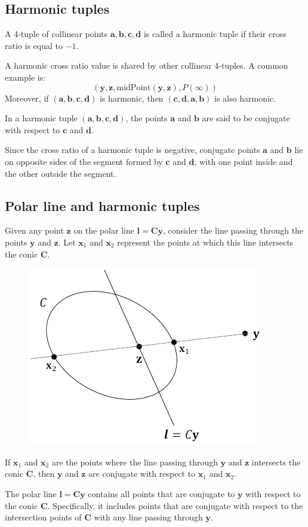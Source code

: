\subsection{Harmonic tuples}
\begin{definition}
    A 4-tuple of collinear points $\mathbf{a}, \mathbf{b}, \mathbf{c}, \mathbf{d}$ is called a harmonic tuple if their cross ratio is equal to $-1$.
\end{definition}
A harmonic cross ratio value is shared by other collinear 4-tuples. 
A common example is:
\[\left( \mathbf{y},\mathbf{z},\text{midPoint}(\mathbf{y},\mathbf{z}),P(\infty) \right)\]
Moreover, if $(\mathbf{a}, \mathbf{b}, \mathbf{c}, \mathbf{d})$ is harmonic, then $(\mathbf{c}, \mathbf{d}, \mathbf{a}, \mathbf{b})$ is also harmonic. 
\begin{definition}
    In a harmonic tuple $(\mathbf{a}, \mathbf{b}, \mathbf{c}, \mathbf{d})$, the points $\mathbf{a}$ and $\mathbf{b}$ are said to be conjugate with respect to $\mathbf{c}$ and $\mathbf{d}$.
\end{definition}
Since the cross ratio of a harmonic tuple is negative, conjugate points $\mathbf{a}$ and $\mathbf{b}$ lie on opposite sides of the segment formed by $\mathbf{c}$ and $\mathbf{d}$, with one point inside and the other outside the segment.

\subsection{Polar line and harmonic tuples}
Given any point $\mathbf{z}$ on the polar line $\mathbf{l}=\mathbf{Cy}$, consider the line passing through the points $\mathbf{y}$ and $\mathbf{z}$. 
Let $\mathbf{x}_1$ and $\mathbf{x}_2$ represent the points at which this line intersects the conic $\mathbf{C}$. 
\begin{figure}[H]
    \centering
    \includegraphics[width=0.25\linewidth]{images/polarharmonic.png}
\end{figure}
\begin{theorem}
    If $\mathbf{x}_1$ and $\mathbf{x}_2$ are the points where the line passing through $\mathbf{y}$ and $\mathbf{z}$ intersects the conic $\mathbf{C}$, then $\mathbf{y}$ and $\mathbf{z}$ are conjugate with respect to $\mathbf{x}_1$ and $\mathbf{x}_2$.
\end{theorem}
The polar line $\mathbf{l}=\mathbf{Cy}$ contains all points that are conjugate to $\mathbf{y}$ with respect to the conic $\mathbf{C}$. 
Specifically, it includes points that are conjugate with respect to the intersection points of $\mathbf{C}$ with any line passing through $\mathbf{y}$.







